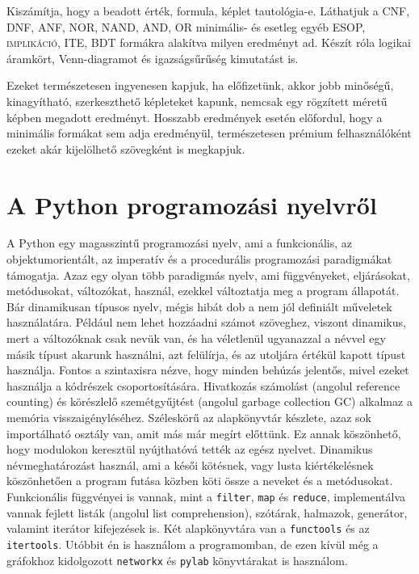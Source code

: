 \documentclass[
]{thesis-ekf}
\theoremstyle{definition}
\theoremstyle{remark}
\begin{document}
	Kiszámítja, hogy a beadott érték, formula, képlet tautológia-e. Láthatjuk a \textsc{CNF, DNF, ANF, NOR, NAND, AND, OR} minimális- és esetleg egyéb \textsc{ESOP, implikáció, ITE, BDT} formákra alakítva milyen eredményt ad. Készít róla logikai áramkört, Venn-diagramot és igazságsűrűség kimutatást is.
	
	Ezeket természetesen ingyenesen kapjuk, ha előfizetünk, akkor jobb minőségű, kinagyítható, szerkeszthető képleteket kapunk, nemcsak egy rögzített méretű képben megadott eredményt. Hosszabb eredmények esetén előfordul, hogy a minimális formákat sem adja eredményül, természetesen prémium felhasználóként ezeket akár kijelölhető szövegként is megkapjuk.
	
	\section{A Python programozási nyelvről}\label{ssec-python-programnyelv}
	A Python egy magasszintű programozási nyelv, ami a funkcionális, az objektumorientált, az imperatív és a procedurális programozási paradigmákat támogatja. Azaz egy olyan több paradigmás nyelv, ami függvényeket, eljárásokat, metódusokat, változókat, használ, ezekkel változtatja meg a program állapotát. Bár dinamikusan típusos nyelv, mégis hibát dob a nem jól definiált műveletek használatára. Például nem lehet hozzáadni számot szöveghez, viszont dinamikus, mert a változóknak csak nevük van, és ha véletlenül ugyanazzal a névvel egy másik típust akarunk használni, azt felülírja, és az utoljára értékül kapott típust használja. Fontos a szintaxisra nézve, hogy minden behúzás jelentős, mivel ezeket használja a kódrészek csoportosítására. Hivatkozás számolást (angolul reference counting) és körészlelő szemétgyűjtést (angolul garbage collection \textsc{GC}) alkalmaz a memória visszaigényléséhez. Széleskörű az alapkönyvtár készlete, azaz sok importálható osztály van, amit más már megírt előttünk. Ez annak köszönhető, hogy modulokon keresztül nyújthatóvá tették az egész nyelvet. Dinamikus névmeghatározást használ, ami a késői kötésnek, vagy lusta kiértékelésnek köszönhetően a program futása közben köti össze a neveket és a metódusokat. Funkcionális függvényei is vannak, mint a \texttt{filter}, \texttt{map} és \texttt{reduce}, implementálva vannak fejlett listák (angolul list comprehension), szótárak, halmazok, generátor, valamint iterátor kifejezések is. Két alapkönyvtára van a \texttt{functools} és az \texttt{itertools}. Utóbbit én is használom a programomban, de ezen kívül még a gráfokhoz kidolgozott \texttt{networkx} és \texttt{pylab} könyvtárakat is használom.
	
\end{document}
